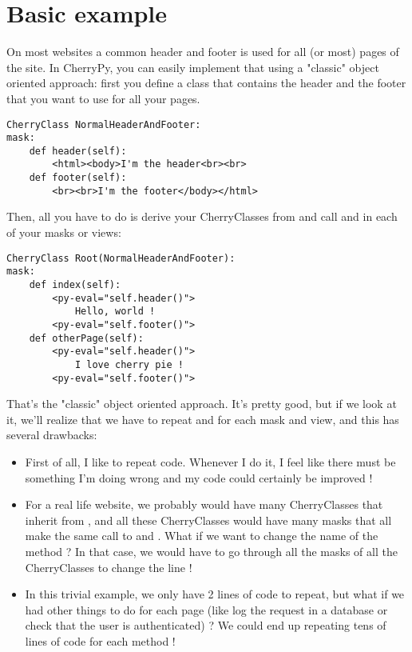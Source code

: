\documentclass{manual}
\begin{document}
\section{Basic example}
On most websites a common header and footer is used for all (or most) pages of the site. In CherryPy, you
can easily implement that using a "classic" object oriented approach: first you define a class that contains
the header and the footer that you want to use for all your pages.

\begin{verbatim}
CherryClass NormalHeaderAndFooter:
mask:
    def header(self):
        <html><body>I'm the header<br><br>
    def footer(self):
        <br><br>I'm the footer</body></html>
\end{verbatim}

Then, all you have to do is derive your CherryClasses from  and call 
and  in each of your masks or views:

\begin{verbatim}
CherryClass Root(NormalHeaderAndFooter):
mask:
    def index(self):
        <py-eval="self.header()">
            Hello, world !
        <py-eval="self.footer()">
    def otherPage(self):
        <py-eval="self.header()">
            I love cherry pie !
        <py-eval="self.footer()">
\end{verbatim}

That's the "classic" object oriented approach. It's pretty good, but if we look at it, we'll realize that we
have to repeat  and  for each mask and view, and this
has several drawbacks:

\begin{itemize}
\item
First of all, I  like to repeat code. Whenever I do it, I feel like there must be something
I'm doing wrong and my code could certainly be improved !
\item
For a real life website, we probably would have many CherryClasses that inherit from , and all these
CherryClasses would have many masks that all make the same call to  and . What if we want to change
the name of the  method ? In that case, we would have to go through all the masks of all the CherryClasses to
change the line !
\item
In this trivial example, we only have 2 lines of code to repeat, but what if we had other things to do for each page
(like log the request in a database or check that the user is authenticated) ? We could end up repeating tens of lines
of code for each method !
\end{itemize}
\end{document}
